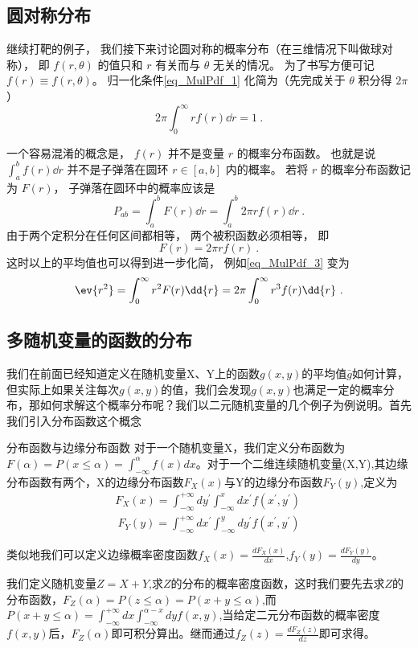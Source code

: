 
\subsection{圆对称分布}
继续打靶的例子， 我们接下来讨论圆对称的概率分布（在三维情况下叫做球对称）， 即 $f(r, \theta)$ 的值只和 $r$ 有关而与 $\theta$ 无关的情况。 为了书写方便可记 $f(r) \equiv f(r, \theta)$。 归一化条件\autoref{eq_MulPdf_1} 化简为（先完成关于 $\theta$ 积分得 $2\pi$）
\begin{equation}
2\pi \int_0^\infty r f(r) \dd{r} = 1~.
\end{equation}

一个容易混淆的概念是， $f(r)$ 并不是变量 $r$ 的概率分布函数。 也就是说 $\int_a^b f(r) \dd{r}$ 并不是子弹落在圆环 $r \in [a, b]$ 内的概率。 若将 $r$ 的概率分布函数记为 $F(r)$， 子弹落在圆环中的概率应该是
\begin{equation}\label{eq_MulPdf_4}
P_{ab} = \int_a^b F(r) \dd{r} = \int_a^b 2\pi r f(r) \dd{r}~.
\end{equation}
由于两个定积分在任何区间都相等， 两个被积函数必须相等， 即
\begin{equation}\label{eq_MulPdf_5}
F(r) = 2\pi r f(r)~.
\end{equation}
这时以上的平均值也可以得到进一步化简， 例如\autoref{eq_MulPdf_3} 变为
\begin{equation}
\ev{r^2} = \int_0^\infty r^2 F(r) \dd{r}
= 2\pi \int_0^\infty r^3 f(r) \dd{r}~.
\end{equation}
\subsection{多随机变量的函数的分布}
我们在前面已经知道定义在随机变量X、Y上的函数$g(x,y)$的平均值$\bar{g}$如何计算，但实际上如果关注每次$g(x,y)$的值，我们会发现$g(x,y)$也满足一定的概率分布，那如何求解这个概率分布呢？我们以二元随机变量的几个例子为例说明。首先我们引入分布函数这个概念
\begin{definition}{分布函数与边缘分布函数}
对于一个随机变量X，我们定义分布函数为$F(\alpha)=P(x\leq \alpha) = \int_{-\infty}^{\alpha} f(x)dx$。对于一个二维连续随机变量(X,Y),其边缘分布函数有两个，X的边缘分布函数$F_X(x)$与Y的边缘分布函数$F_Y(y)$,定义为
\begin{align}
F_X(x) = \int_{-\infty}^{+\infty} dy^\prime \int_{-\infty}^{x} dx^\prime f(x^\prime,y^\prime)\\~
F_Y(y) = \int_{-\infty}^{+\infty} dx^\prime \int_{-\infty}^y dy^\prime f(x^\prime,y^\prime)~
\end{align}
\end{definition}
类似地我们可以定义边缘概率密度函数$f_X(x) = \frac{dF_X(x)}{dx}$,$f_Y(y) = \frac{dF_Y(y)}{dy}$。

\begin{example}{}
我们定义随机变量$Z=X+Y$,求$Z$的分布的概率密度函数，这时我们要先去求$Z$的分布函数，$F_Z(\alpha)=P(z\leq \alpha) = P(x+y\leq \alpha)$,而$P(x+y\leq \alpha) = \int_{-\infty}^{+\infty}dx \int_{-\infty}^{\alpha-x} dy f(x,y)$,当给定二元分布函数的概率密度$f(x,y)$后，$F_Z(\alpha)$即可积分算出。继而通过$f_Z(z) = \frac{d F_Z(z)}{dz}$即可求得。
\end{example}
